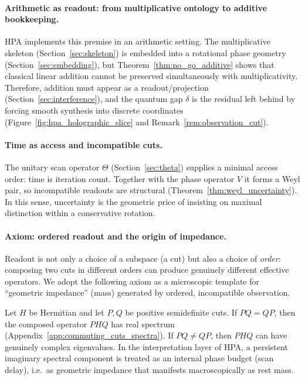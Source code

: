 \paragraph{Arithmetic as readout: from multiplicative ontology to additive bookkeeping.}
HPA implements this premise in an arithmetic setting.
The multiplicative skeleton (Section~\ref{sec:skeleton}) is embedded into a rotational phase geometry (Section~\ref{sec:embedding}), but Theorem~\ref{thm:no_go_additive} shows that classical linear addition cannot be preserved simultaneously with multiplicativity.
Therefore, addition must appear as a readout/projection (Section~\ref{sec:interference}), and the quantum gap $\delta$ is the residual left behind by forcing smooth synthesis into discrete coordinates (Figure~\ref{fig:hpa_holographic_slice} and Remark~\ref{rem:observation_cut}).

\paragraph{Time as access and incompatible cuts.}
The unitary scan operator $\Theta$ (Section~\ref{sec:theta}) supplies a minimal access order: time is iteration count.
Together with the phase operator $V$ it forms a Weyl pair, so incompatible readouts are structural (Theorem~\ref{thm:weyl_uncertainty}).
In this sense, uncertainty is the geometric price of insisting on maximal distinction within a conservative rotation.

\paragraph{Axiom: ordered readout and the origin of impedance.}
Readout is not only a choice of a subspace (a cut) but also a choice of \emph{order}: composing two cuts in different orders can produce genuinely different effective operators.
We adopt the following axiom as a microscopic template for ``geometric impedance'' (mass) generated by ordered, incompatible observation.

\begin{axiom}
\label{ax:impedance_from_noncommutative_cuts}
Let $H$ be Hermitian and let $P,Q$ be positive semidefinite cuts.
If $PQ=QP$, then the composed operator $PHQ$ has real spectrum (Appendix~\ref{app:commuting_cuts_spectra}).
If $PQ\ne QP$, then $PHQ$ can have genuinely complex eigenvalues.
In the interpretation layer of HPA, a persistent imaginary spectral component is treated as an internal phase budget (scan delay), i.e.\ as geometric impedance that manifests macroscopically as rest mass.
\end{axiom}
